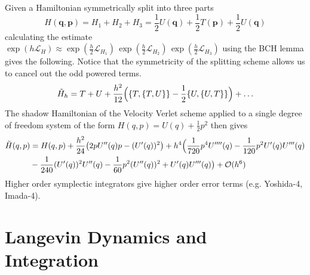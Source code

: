 \documentclass{article}
\begin{document}
      Given a Hamiltonian symmetrically split into three parts
      \begin{equation}
        H(\mathbf{q}, \mathbf{p}) =  H_1 + H_2 + H_3 = \frac{1}{2} U(\mathbf{q}) + \frac{1}{2} T(\mathbf{p}) + \frac{1}{2} U(\mathbf{q})
      \end{equation}
      calculating the estimate $\exp{(h \mathcal{L}_H)} \approx \exp(\frac{h}{2} \mathcal{L}_{H_1})\,\exp(\frac{h}{2} \mathcal{L}_{H_2})\,\exp(\frac{h}{2} \mathcal{L}_{H_3})$ using the BCH lemma gives the following. Notice that the symmetricity of the splitting scheme allows us to cancel out the odd powered terms. 
      \begin{equation}
        \Tilde{H}_h = T + U + \frac{h^2}{12} \Big( \{ T, \{T, U\}\} - \frac{1}{2} \{U, \{U, T\}\} \Big) + \ldots
      \end{equation}
      The shadow Hamiltonian of the Velocity Verlet scheme applied to a single degree of freedom system of the form $H(q, p) = U(q) + \frac{1}{2} p^2$ then gives 
      \begin{align*}
        \Tilde{H}(q, p) & = H(q, p) + \frac{h^2}{24} \big(2 p U'' (q) p - (U^\prime (q))^2 \big) + h^4 \Big( \frac{1}{720} p^4 U''''(q) - \frac{1}{120} p^2 U'(q) U'''(q) \\
        & - \frac{1}{240} (U'(q))^2 U''(q) - \frac{1}{60} p^2 (U''(q))^2 + U'(q) U'''(q) \big) + \mathcal{O}(h^6) 
      \end{align*}
      Higher order symplectic integrators give higher order error terms (e.g. Yoshida-4, Imada-4). 

\section{Langevin Dynamics and Integration}
\end{document}
